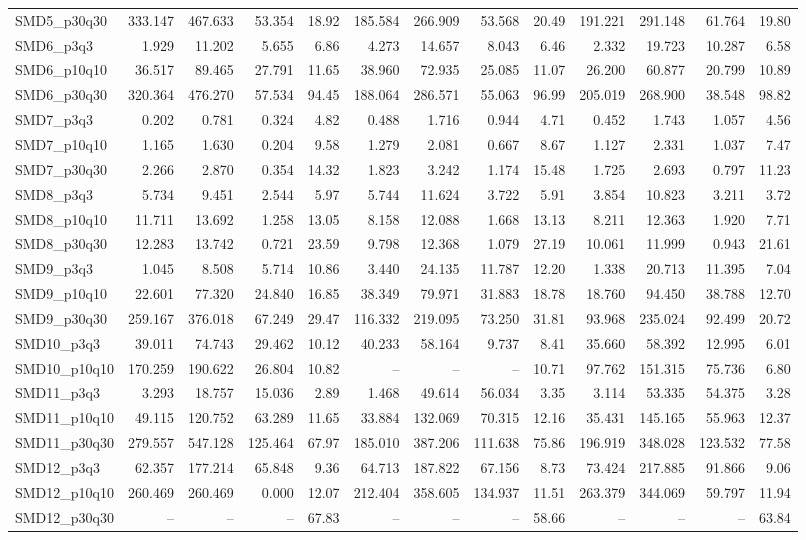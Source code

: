 \begin{longtable}{lrrrrrrrrrrrr}
SMD5\_p30q30 & 333.147 & 467.633 & 53.354 & 18.92 & 185.584 & 266.909 & 53.568 & 20.49 & 191.221 & 291.148 & 61.764 & 19.80 \\
SMD6\_p3q3 & 1.929 & 11.202 & 5.655 & 6.86 & 4.273 & 14.657 & 8.043 & 6.46 & 2.332 & 19.723 & 10.287 & 6.58 \\
SMD6\_p10q10 & 36.517 & 89.465 & 27.791 & 11.65 & 38.960 & 72.935 & 25.085 & 11.07 & 26.200 & 60.877 & 20.799 & 10.89 \\
SMD6\_p30q30 & 320.364 & 476.270 & 57.534 & 94.45 & 188.064 & 286.571 & 55.063 & 96.99 & 205.019 & 268.900 & 38.548 & 98.82 \\
SMD7\_p3q3 & 0.202 & 0.781 & 0.324 & 4.82 & 0.488 & 1.716 & 0.944 & 4.71 & 0.452 & 1.743 & 1.057 & 4.56 \\
SMD7\_p10q10 & 1.165 & 1.630 & 0.204 & 9.58 & 1.279 & 2.081 & 0.667 & 8.67 & 1.127 & 2.331 & 1.037 & 7.47 \\
SMD7\_p30q30 & 2.266 & 2.870 & 0.354 & 14.32 & 1.823 & 3.242 & 1.174 & 15.48 & 1.725 & 2.693 & 0.797 & 11.23 \\
SMD8\_p3q3 & 5.734 & 9.451 & 2.544 & 5.97 & 5.744 & 11.624 & 3.722 & 5.91 & 3.854 & 10.823 & 3.211 & 3.72 \\
SMD8\_p10q10 & 11.711 & 13.692 & 1.258 & 13.05 & 8.158 & 12.088 & 1.668 & 13.13 & 8.211 & 12.363 & 1.920 & 7.71 \\
SMD8\_p30q30 & 12.283 & 13.742 & 0.721 & 23.59 & 9.798 & 12.368 & 1.079 & 27.19 & 10.061 & 11.999 & 0.943 & 21.61 \\
SMD9\_p3q3 & 1.045 & 8.508 & 5.714 & 10.86 & 3.440 & 24.135 & 11.787 & 12.20 & 1.338 & 20.713 & 11.395 & 7.04 \\
SMD9\_p10q10 & 22.601 & 77.320 & 24.840 & 16.85 & 38.349 & 79.971 & 31.883 & 18.78 & 18.760 & 94.450 & 38.788 & 12.70 \\
SMD9\_p30q30 & 259.167 & 376.018 & 67.249 & 29.47 & 116.332 & 219.095 & 73.250 & 31.81 & 93.968 & 235.024 & 92.499 & 20.72 \\
SMD10\_p3q3 & 39.011 & 74.743 & 29.462 & 10.12 & 40.233 & 58.164 & 9.737 & 8.41 & 35.660 & 58.392 & 12.995 & 6.01 \\
SMD10\_p10q10 & 170.259 & 190.622 & 26.804 & 10.82 & -- & -- & -- & 10.71 & 97.762 & 151.315 & 75.736 & 6.80 \\
SMD11\_p3q3 & 3.293 & 18.757 & 15.036 & 2.89 & 1.468 & 49.614 & 56.034 & 3.35 & 3.114 & 53.335 & 54.375 & 3.28 \\
SMD11\_p10q10 & 49.115 & 120.752 & 63.289 & 11.65 & 33.884 & 132.069 & 70.315 & 12.16 & 35.431 & 145.165 & 55.963 & 12.37 \\
SMD11\_p30q30 & 279.557 & 547.128 & 125.464 & 67.97 & 185.010 & 387.206 & 111.638 & 75.86 & 196.919 & 348.028 & 123.532 & 77.58 \\
SMD12\_p3q3 & 62.357 & 177.214 & 65.848 & 9.36 & 64.713 & 187.822 & 67.156 & 8.73 & 73.424 & 217.885 & 91.866 & 9.06 \\
SMD12\_p10q10 & 260.469 & 260.469 & 0.000 & 12.07 & 212.404 & 358.605 & 134.937 & 11.51 & 263.379 & 344.069 & 59.797 & 11.94 \\
SMD12\_p30q30 & -- & -- & -- & 67.83 & -- & -- & -- & 58.66 & -- & -- & -- & 63.84 \\
\end{longtable}
